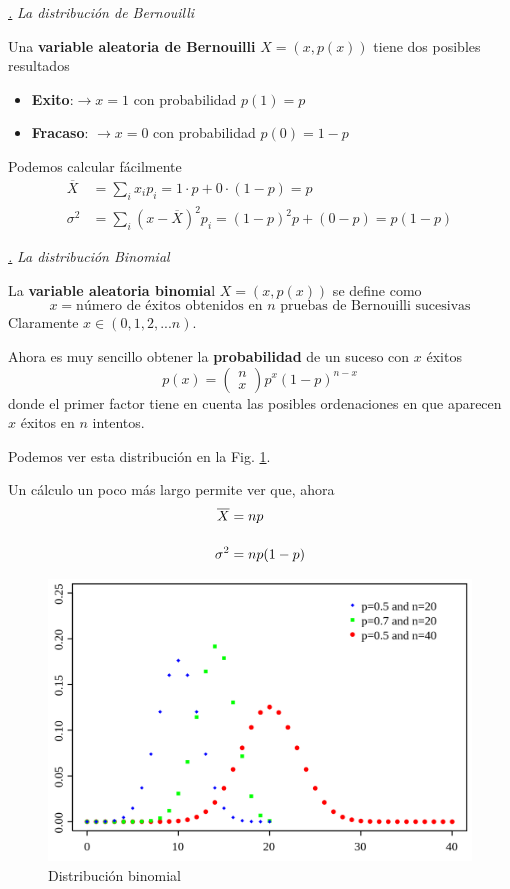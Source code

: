 \documentclass[a4paper,11pt]{book} %
\numberwithin{equation}{chapter}
\def\subsubiContadorIt{\par\addtocounter{subsubsection}{1}\underline{\it\thesubsubsection.}\hskip0.5cm \setcounter{subsubsubsectionIt}{0}}
\newcommand{\SubsubiIt}[1]{
		\subsubiContadorIt \textit{#1}
	}
\newcounter{subsubsubsectionIt}[subsubsection]
\begin{document}
			\SubsubiIt{La distribución de Bernouilli}
\begin{mybox_gray2}{}
Una \textbf{variable aleatoria de Bernouilli} $X=(x,p(x))$ tiene dos posibles resultados
\begin{itemize}
	\item \textbf{Exito}:$\to x=1$ con probabilidad $p(1) = p$

	\item \textbf{Fracaso}: $\to x=0$ con probabilidad $p(0) = 1-p$
\end{itemize}
\end{mybox_gray2}

Podemos calcular fácilmente 
	\begin{align}
	\overline X & = \sum_i x_i p_i = 1 \cdot p +0 \cdot (1-p) = p \\
	\sigma^2 & = \sum_i (x-\overline X)^2p_i = (1-p)^2p +(0-p) = p(1-p)
	\end{align}



			\SubsubiIt{La distribución Binomial}

\begin{mybox_gray2}{}
La \textbf{variable aleatoria binomia}l $X = (x,p(x))$ se define como
	\begin{equation}
	x = \text{número de éxitos obtenidos en } n \text{ pruebas de Bernouilli sucesivas}
	\end{equation}
Claramente $x \in (0,1,2,...n)$.

Ahora es muy sencillo obtener la \textbf{probabilidad} de un suceso con $x$ éxitos
	\begin{equation}
	p(x) = \begin{pmatrix}n\\ x\end{pmatrix} p^x (1-p)^{n-x}
	\end{equation}
donde el primer factor tiene en cuenta las posibles ordenaciones en que aparecen $x$ éxitos en $n$ intentos.
\end{mybox_gray2}

Podemos ver esta distribución en la Fig. \ref{Fig_formalismo_dist_binomial}.

Un cálculo un poco más largo permite ver que, ahora
	\begin{align}
	\overline X &=  np\\ \rule{0mm}{7mm}
	\sigma^2 &= n p(1-p)
	\end{align}

	\begin{figure}[H]
	\centering 
	\includegraphics[width=0.4\linewidth]{Figuras/Fig_formalismo_dist_binomial.png}
	\caption{Distribución binomial}
	\label{Fig_formalismo_dist_binomial}
	\end{figure}
\end{document}
